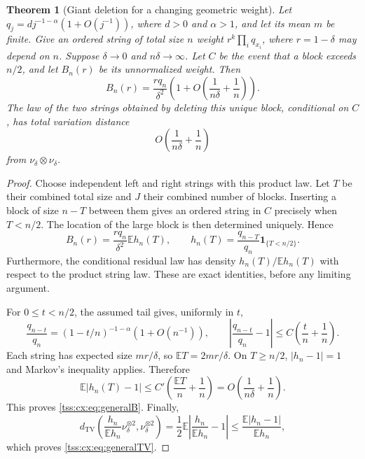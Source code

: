 \documentclass[11pt]{article}
\newtheorem{theorem}{Theorem}[section]
\theoremstyle{remark}\newtheorem{remark}[theorem]{Remark}
\theoremstyle{definition}\newtheorem{definition}[theorem]{Definition}
\newcommand{\E}{\mathbb E}
\newcommand{\TV}{d_{\mathrm{TV}}}
\newcommand{\ind}{\mathbf 1}
\begin{document}
\begin{theorem}[Giant deletion for a changing geometric weight]
\label{tss:cx:thm:generalTV}
Let $q_j=dj^{-1-\alpha}(1+O(j^{-1}))$, where $d>0$ and $\alpha>1$,
and let its mean $m$ be finite. Give an ordered string of total size
$n$ weight $r^k\prod_iq_{x_i}$, where $r=1-\delta$ may depend on $n$.
Suppose $\delta\to0$ and $n\delta\to\infty$.
Let $C$ be the event that a block exceeds $n/2$, and let $B_n(r)$
be its unnormalized weight. Then
\begin{equation}\label{tss:cx:eq:generalB}
 B_n(r)=\frac{r q_n}{\delta^2}
       \left(1+O\left(\frac1{n\delta}+\frac1n\right)\right).
\end{equation}
The law of the two strings obtained by deleting this unique block,
conditional on $C$, has total variation distance
\begin{equation}\label{tss:cx:eq:generalTV}
 O\left(\frac1{n\delta}+\frac1n\right)
\end{equation}
from $\nu_\delta\otimes\nu_\delta$.
\end{theorem}
\begin{proof}
Choose independent left and right strings with this product law.
Let $T$ be their combined total size and $J$ their combined number
of blocks. Inserting a block of size $n-T$ between them gives an
ordered string in $C$ precisely when $T<n/2$. The location of the
large block is then determined uniquely. Hence
\begin{equation}\label{tss:cx:eq:RN}
 B_n(r)=\frac{r q_n}{\delta^2}\E h_n(T),\qquad
 h_n(T)=\frac{q_{n-T}}{q_n}\ind_{\{T<n/2\}}.
\end{equation}
Furthermore, the conditional residual law has density
$h_n(T)/\E h_n(T)$ with respect to the product string law. These
are exact identities, before any limiting argument.

For $0\le t<n/2$, the assumed tail gives, uniformly in $t$,
\[
 \frac{q_{n-t}}{q_n}
 =(1-t/n)^{-1-\alpha}(1+O(n^{-1})),\qquad
 \left|\frac{q_{n-t}}{q_n}-1\right|
 \le C\left(\frac tn+\frac1n\right).
\]
Each string has expected size $mr/\delta$, so
$\E T=2mr/\delta$. On $T\ge n/2$, $|h_n-1|=1$ and Markov's
inequality applies. Therefore
\begin{equation}\label{tss:cx:eq:L1}
 \E|h_n(T)-1|
 \le C'\left(\frac{\E T}{n}+\frac1n\right)
 =O\left(\frac1{n\delta}+\frac1n\right).
\end{equation}
This proves \eqref{tss:cx:eq:generalB}. Finally,
\[
 \TV\left(\frac{h_n}{\E h_n}\nu_\delta^{\otimes2},
           \nu_\delta^{\otimes2}\right)
 =\frac12\E\left|\frac{h_n}{\E h_n}-1\right|
 \le\frac{\E|h_n-1|}{\E h_n},
\]
which proves \eqref{tss:cx:eq:generalTV}.
\end{proof}
\end{document}
